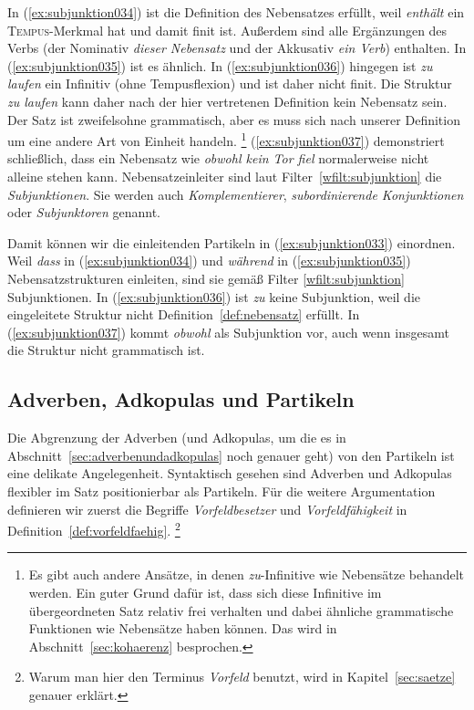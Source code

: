 In (\ref{ex:subjunktion034}) ist die Definition des Nebensatzes erfüllt, weil \textit{enthält} ein \textsc{Tempus}-Merkmal hat und damit finit ist.
Außerdem sind alle Ergänzungen des Verbs (der Nominativ \textit{dieser Nebensatz} und der Akkusativ \textit{ein Verb}) enthalten.
In (\ref{ex:subjunktion035}) ist es ähnlich.
In (\ref{ex:subjunktion036}) hingegen ist \textit{zu laufen} ein Infinitiv (ohne Tempusflexion) und ist daher nicht finit.
Die Struktur \textit{zu laufen} kann daher nach der hier vertretenen Definition kein Nebensatz sein.
Der Satz ist zweifelsohne grammatisch, aber es muss sich nach unserer Definition um eine andere Art von Einheit handeln.%
\footnote{Es gibt auch andere Ansätze, in denen \textit{zu}-Infinitive wie Nebensätze behandelt werden.
Ein guter Grund dafür ist, dass sich diese Infinitive im übergeordneten Satz relativ frei verhalten und dabei ähnliche grammatische Funktionen wie Nebensätze haben können.
Das wird in Abschnitt~\ref{sec:kohaerenz} besprochen.}
(\ref{ex:subjunktion037}) demonstriert schließlich, dass ein Nebensatz wie \textit{obwohl kein Tor fiel} normalerweise nicht alleine stehen kann.
Nebensatzeinleiter sind laut Filter~\ref{wfilt:subjunktion} die \textit{Subjunktionen}.
Sie werden auch \textit{Komplementierer}, \textit{subordinierende Konjunktionen} oder \textit{Subjunktoren} genannt.



Damit können wir die einleitenden Partikeln in (\ref{ex:subjunktion033}) einordnen.
Weil \textit{dass} in (\ref{ex:subjunktion034}) und \textit{während} in (\ref{ex:subjunktion035}) Nebensatzstrukturen einleiten, sind sie gemäß Filter \ref{wfilt:subjunktion} Subjunktionen.
In (\ref{ex:subjunktion036}) ist \textit{zu} keine Subjunktion, weil die eingeleitete Struktur nicht Definition~\ref{def:nebensatz} erfüllt.
In (\ref{ex:subjunktion037}) kommt \textit{obwohl} als Subjunktion vor, auch wenn insgesamt die Struktur nicht grammatisch ist.


\subsection{Adverben, Adkopulas und Partikeln}
\label{sec:adverbenadkopulasundpartikeln}


Die Abgrenzung der Adverben (und Adkopulas, um die es in Abschnitt~\ref{sec:adverbenundadkopulas} noch genauer geht) von den Partikeln ist eine delikate Angelegenheit.
Syntaktisch gesehen sind Adverben und Adkopulas flexibler im Satz positionierbar als Partikeln.
Für die weitere Argumentation definieren wir zuerst die Begriffe \textit{Vorfeldbesetzer} und \textit{Vorfeldfähigkeit} in Definition~\ref{def:vorfeldfaehig}.%
\footnote{Warum man hier den Terminus \textit{Vorfeld} benutzt, wird in Kapitel~\ref{sec:saetze} genauer erklärt.}

